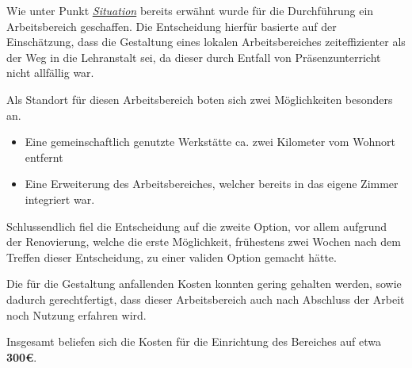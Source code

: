 Wie unter Punkt \hyperref[covid]{\textit{Situation}} bereits erwähnt wurde für die Durchführung ein Arbeitsbereich geschaffen.
Die Entscheidung hierfür basierte auf der Einschätzung, dass die Gestaltung eines lokalen Arbeitsbereiches zeiteffizienter als der Weg in die Lehranstalt sei, da dieser durch Entfall von Präsenzunterricht nicht allfällig war.

Als Standort für diesen Arbeitsbereich boten sich zwei Möglichkeiten besonders an.

\begin{itemize}
    \item Eine gemeinschaftlich genutzte Werkstätte ca. zwei Kilometer vom Wohnort entfernt
    \item Eine Erweiterung des Arbeitsbereiches, welcher bereits in das eigene Zimmer integriert war.
\end{itemize}

Schlussendlich fiel die Entscheidung auf die zweite Option, vor allem aufgrund der Renovierung, welche die erste Möglichkeit, frühestens zwei Wochen nach dem Treffen dieser Entscheidung, zu einer validen Option gemacht hätte.

Die für die Gestaltung anfallenden Kosten konnten gering gehalten werden, sowie dadurch gerechtfertigt, dass dieser Arbeitsbereich auch nach Abschluss der Arbeit noch Nutzung erfahren wird.

Insgesamt beliefen sich die Kosten für die Einrichtung des Bereiches auf etwa \textbf{300€}.
